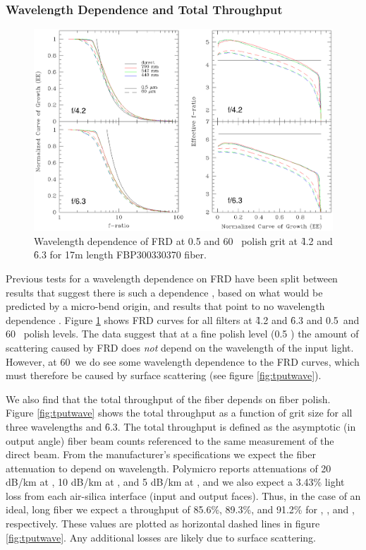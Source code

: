 \subsubsection{Wavelength Dependence and Total Throughput}
\label{FRD:sec:wavelength}
\begin{figure}[ht]
  \centering
  \includegraphics[width=\textwidth, trim=0 2.6in 0 0, clip=true]{FRD/figs/filters.eps}
  \caption[Dependence of FRD on wavelength]{\fixspacing\label{fig:wave}
    Wavelength dependence of FRD at 0.5 and 60 \mum\ polish grit at \f4.2
    and \f6.3 for 17m length FBP300330370 fiber.}
\end{figure}

Previous tests for a wavelength dependence on FRD have been split
between results that suggest there is such a
dependence \citep{Carrasco,Gloge72}, based on what would be predicted by
a micro-bend origin, and results that point to no wavelength
dependence \citep{Mab_04, Schmoll_03}. Figure \ref{fig:wave} shows FRD
curves for all filters at \f4.2 and \f6.3 and 0.5\mum\ and 60
\mum\ polish levels. The data suggest that at a fine polish level (0.5
\mum) the amount of scattering caused by FRD does {\it not} depend on
the wavelength of the input light. However, at 60\mum\ we do see some
wavelength dependence to the FRD curves, which  must therefore be
caused by surface scattering (see figure \ref{fig:tputwave}).

We also find that the total throughput of the fiber depends on
fiber polish. Figure \ref{fig:tputwave} shows the
total throughput as a function of grit size for all three wavelengths
and \f6.3. The total throughput is defined as the asymptotic (in output
 angle) fiber beam counts referenced to the same measurement of the direct
 beam. From the manufacturer's specifications
we expect the fiber attenuation to depend on wavelength. Polymicro
reports attenuations of 20 dB/km at \filtB, 10 dB/km at \filty, and 5
dB/km at \filtI, and we also expect a 3.43\% light loss from each
air-silica interface (input and output faces). Thus, in the case of an
ideal,  long fiber we expect a throughput of 85.6\%,
89.3\%, and 91.2\% for \filtB, \filty, and \filtI, respectively. These
values are plotted as horizontal dashed lines in figure
\ref{fig:tputwave}. Any additional losses are likely due to surface
scattering.

